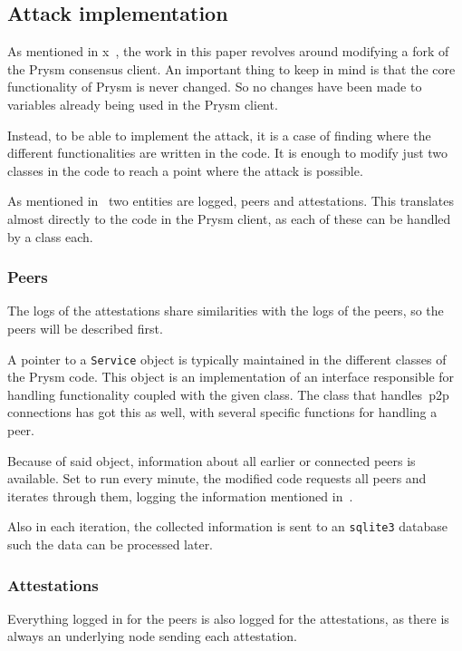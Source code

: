 \subsection{Attack implementation}\label{subsec:attack-implementation}
As mentioned in x~,
the work in this paper revolves around modifying a fork of the Prysm consensus client.
An important thing to keep in mind is that the core functionality of Prysm is never changed.
So no changes have been made to variables already being used in the Prysm client.

Instead, to be able to implement the attack,
it is a case of finding where the different functionalities are written in the code.
It is enough to modify just two classes in the code to reach a point where the attack is possible.

As mentioned in~ two entities are logged, peers and attestations.
This translates almost directly to the code in the Prysm client, as each of these can be handled by a class each. 

\subsubsection{Peers}\label{subsubsec:peers}
The logs of the attestations share similarities with the logs of the peers, so the peers will be described first.

A pointer to a \texttt{Service} object is typically maintained in the different classes of the Prysm code.
This object is an implementation of an interface responsible for handling functionality coupled with the given class.
The class that handles~\gls{p2p} connections has got this as well, with several specific functions for handling a peer.

Because of said object, information about all earlier or connected peers is available.
Set to run every minute, the modified code requests all peers and iterates through them,
logging the information mentioned in~.


Also in each iteration,
the collected information is sent to an \texttt{sqlite3} database such the data can be processed later.

\subsubsection{Attestations}\label{subsubsec:attestations}
Everything logged in for the peers is also logged for the attestations,
as there is always an underlying node sending each attestation.

